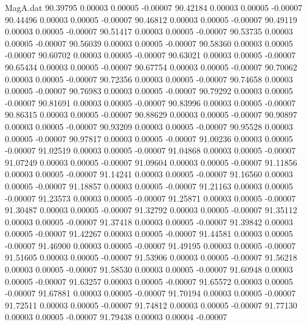 \begin{filecontents}{MagA.dat}
  90.39795    0.00003    0.00005   -0.00007
  90.42184    0.00003    0.00005   -0.00007
  90.44496    0.00003    0.00005   -0.00007
  90.46812    0.00003    0.00005   -0.00007
  90.49119    0.00003    0.00005   -0.00007
  90.51417    0.00003    0.00005   -0.00007
  90.53735    0.00003    0.00005   -0.00007
  90.56039    0.00003    0.00005   -0.00007
  90.58360    0.00003    0.00005   -0.00007
  90.60702    0.00003    0.00005   -0.00007
  90.63021    0.00003    0.00005   -0.00007
  90.65434    0.00003    0.00005   -0.00007
  90.67754    0.00003    0.00005   -0.00007
  90.70062    0.00003    0.00005   -0.00007
  90.72356    0.00003    0.00005   -0.00007
  90.74658    0.00003    0.00005   -0.00007
  90.76983    0.00003    0.00005   -0.00007
  90.79292    0.00003    0.00005   -0.00007
  90.81691    0.00003    0.00005   -0.00007
  90.83996    0.00003    0.00005   -0.00007
  90.86315    0.00003    0.00005   -0.00007
  90.88629    0.00003    0.00005   -0.00007
  90.90897    0.00003    0.00005   -0.00007
  90.93209    0.00003    0.00005   -0.00007
  90.95528    0.00003    0.00005   -0.00007
  90.97817    0.00003    0.00005   -0.00007
  91.00236    0.00003    0.00005   -0.00007
  91.02519    0.00003    0.00005   -0.00007
  91.04868    0.00003    0.00005   -0.00007
  91.07249    0.00003    0.00005   -0.00007
  91.09604    0.00003    0.00005   -0.00007
  91.11856    0.00003    0.00005   -0.00007
  91.14241    0.00003    0.00005   -0.00007
  91.16560    0.00003    0.00005   -0.00007
  91.18857    0.00003    0.00005   -0.00007
  91.21163    0.00003    0.00005   -0.00007
  91.23573    0.00003    0.00005   -0.00007
  91.25871    0.00003    0.00005   -0.00007
  91.30487    0.00003    0.00005   -0.00007
  91.32792    0.00003    0.00005   -0.00007
  91.35112    0.00003    0.00005   -0.00007
  91.37418    0.00003    0.00005   -0.00007
  91.39842    0.00003    0.00005   -0.00007
  91.42267    0.00003    0.00005   -0.00007
  91.44581    0.00003    0.00005   -0.00007
  91.46900    0.00003    0.00005   -0.00007
  91.49195    0.00003    0.00005   -0.00007
  91.51605    0.00003    0.00005   -0.00007
  91.53906    0.00003    0.00005   -0.00007
  91.56218    0.00003    0.00005   -0.00007
  91.58530    0.00003    0.00005   -0.00007
  91.60948    0.00003    0.00005   -0.00007
  91.63257    0.00003    0.00005   -0.00007
  91.65572    0.00003    0.00005   -0.00007
  91.67881    0.00003    0.00005   -0.00007
  91.70194    0.00003    0.00005   -0.00007
  91.72511    0.00003    0.00005   -0.00007
  91.74812    0.00003    0.00005   -0.00007
  91.77130    0.00003    0.00005   -0.00007
  91.79438    0.00003    0.00004   -0.00007

\end{filecontents}
